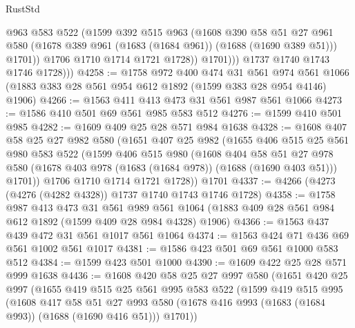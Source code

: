 \begin{lexlean}{RustStd}
\begin{coremodule}
                    @963
                    @583
                    @522
                    (@1599
                      @392
                      @515
                      @963
                      (@1608
                        @390
                        @58
                        @51
                        @27
                        @961
                        @580
                        (@1678 @389 @961 (@1683 (@1684 @961)) (@1688 (@1690 @389 @51)))
                        @1701))
                    @1706
                    @1710
                    @1714
                    @1721
                    @1728))
                @1701)))
          @1737
          @1740
          @1743
          @1746
          @1728)))
@4258 := @1758
    @972
    @400
    @474
    @31
    @561
    @974
    @561
    @1066
    (@1883 @383 @28 @561 @954 @612 @1892 (@1599 @383 @28 @954 @4146) @1906)
@4266 := @1563 @411 @413 @473 @31 @561 @987 @561 @1066
@4273 := @1586 @410 @501 @69 @561 @985 @583 @512
@4276 := @1599 @410 @501 @985
@4282 := @1609 @409 @25 @28 @571 @984 @1638
@4328 := @1608
    @407
    @58
    @25
    @27
    @982
    @580
    (@1651
      @407
      @25
      @982
      (@1655
        @406
        @515
        @25
        @561
        @980
        @583
        @522
        (@1599
          @406
          @515
          @980
          (@1608
            @404
            @58
            @51
            @27
            @978
            @580
            (@1678 @403 @978 (@1683 (@1684 @978)) (@1688 (@1690 @403 @51)))
            @1701))
        @1706
        @1710
        @1714
        @1721
        @1728))
    @1701
@4337 := @4266 (@4273 (@4276 (@4282 @4328)) @1737 @1740 @1743 @1746 @1728)
@4358 := @1758
    @987
    @413
    @473
    @31
    @561
    @989
    @561
    @1064
    (@1883 @409 @28 @561 @984 @612 @1892 (@1599 @409 @28 @984 @4328) @1906)
@4366 := @1563 @437 @439 @472 @31 @561 @1017 @561 @1064
@4374 := @1563 @424 @71 @436 @69 @561 @1002 @561 @1017
@4381 := @1586 @423 @501 @69 @561 @1000 @583 @512
@4384 := @1599 @423 @501 @1000
@4390 := @1609 @422 @25 @28 @571 @999 @1638
@4436 := @1608
    @420
    @58
    @25
    @27
    @997
    @580
    (@1651
      @420
      @25
      @997
      (@1655
        @419
        @515
        @25
        @561
        @995
        @583
        @522
        (@1599
          @419
          @515
          @995
          (@1608
            @417
            @58
            @51
            @27
            @993
            @580
            (@1678 @416 @993 (@1683 (@1684 @993)) (@1688 (@1690 @416 @51)))
            @1701))

\end{coremodule}
\end{lexlean}
